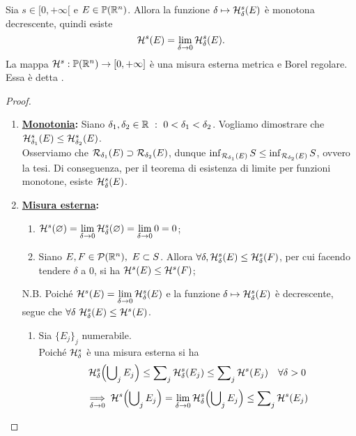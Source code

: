 \begin{shadedTheorem}[$**$| Hausdorff]\label{thm: 1.9 Hausdorff}
  Sia $s\in [0,+\infty[$ e $E\in \mathbb{P}(\mathbb{R}^n)$. Allora la funzione $\delta \mapsto \mathcal{H}^s_\delta(E)$ è monotona decrescente, quindi esiste 
  \[\mathcal{H}^s(E)=\lim_{\delta \to 0}\mathcal{H}^s_\delta(E).\]
  La mappa $\mathcal{H}^s:\mathbb{P}(\mathbb{R}^n)\to [0,+\infty]$ è una misura esterna metrica e Borel regolare. Essa è detta .
\end{shadedTheorem}
\begin{proof}~
  \begin{enumerate}[label=\textbf{\Large\arabic*.}, ref=\textbf{\underline{(\arabic*)}}]
      \item \textbf{\underline{Monotonia}:} Siano $\delta_1, \delta_2 \in \mathbb{R} \ :\  0<\delta_1 < \delta_2$. Vogliamo dimostrare che $\mathcal{H}_{\delta_1}^s(E) \le \mathcal{H}_{\delta_2}^s(E)$.\\
      Osserviamo che $\mathcal{R}_{\delta_1}(E) \supset \mathcal{R}_{\delta_2}(E)$, dunque $\inf_{\mathcal{R}_{\delta_1}(E)}S \le \inf_{\mathcal{R}_{\delta_2}(E)}S$, ovvero la tesi. Di conseguenza, per il teorema di esistenza di limite per funzioni monotone, esiste $\mathcal{H}^s_\delta(E)$.
      \item \textbf{\underline{Misura esterna}:} \begin{enumerate}[label=$\roman*)$]
          \item $\mathcal{H}^s(\varnothing)=\lim\limits_{\delta \to 0}\mathcal{H}^s_\delta(\varnothing)=\lim\limits_{\delta \to 0}0=0$;
          \item Siano $E,F\in \mathcal{P}(\mathbb{R}^n),\ E\subset S$. Allora $\forall \delta, \mathcal{H}^s_\delta(E)\leq \mathcal{H}^s_\delta(F)$, per cui facendo tendere $\delta$ a $0$, si ha $\mathcal{H}^s(E)\leq \mathcal{H}^s(F)$;
      \end{enumerate}
      N.B. Poiché $\mathcal{H}^s(E)=\lim\limits_{\delta \to 0}\mathcal{H}^s_\delta(E)$ e la funzione $\delta \mapsto \mathcal{H}^s_\delta(E)$ è decrescente, segue che $\forall \delta\ \mc{H}^s_\delta(E)\leq \mc{H}^s(E)$.
      \begin{enumerate}[resume,label=$\roman*)$]
          \item Sia $\{E_j\}_{j}$ numerabile. \\
          Poiché $\mathcal{H}^s_\delta$ è una misura esterna si ha \[\mathcal{H}^s_\delta\Bigl(\bigcup\nolimits_jE_j\Bigr)\leq \sum\nolimits_j\mathcal{H}^s_\delta(E_j)\leq \sum\nolimits_j\mathcal{H}^s(E_j)\quad \forall \delta >0\]
          \[\underset{\delta \to 0}\implies \mathcal{H}^s\Bigl(\bigcup\nolimits_jE_j\Bigr) = \lim_{\delta \to 0}\mathcal{H}^s_\delta\Bigl(\bigcup\nolimits_jE_j\Bigr)\leq \sum\nolimits_j\mathcal{H}^s(E_j)\]

\end{enumerate}
\end{enumerate}
\end{proof}
